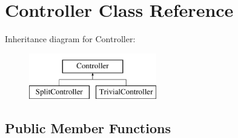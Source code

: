 \hypertarget{classController}{
\section{Controller Class Reference}
\label{classController}
}
Inheritance diagram for Controller:\begin{figure}[H]
\begin{center}
\leavevmode
\includegraphics[height=2cm]{classController}
\end{center}
\end{figure}
\subsection*{Public Member Functions}
